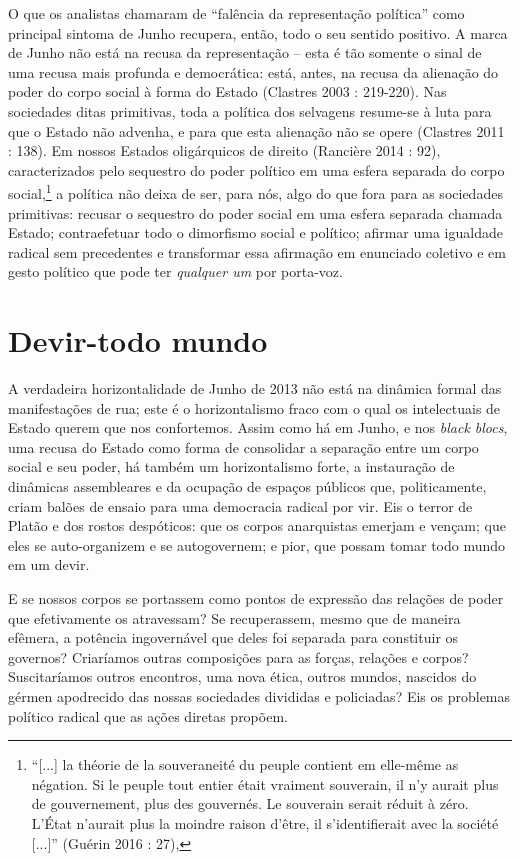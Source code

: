 O que os analistas chamaram de ``falência da representação política''
como principal sintoma de Junho recupera, então, todo o seu sentido
positivo. A marca de Junho não está na recusa da representação -- esta é
tão somente o sinal de uma recusa mais profunda e democrática: está,
antes, na recusa da alienação do poder do corpo social à forma do Estado
(Clastres 2003 : 219-220). Nas sociedades ditas primitivas, toda a
política dos selvagens resume-se à luta para que o Estado não advenha, e
para que esta alienação não se opere (Clastres 2011 : 138). Em nossos
Estados oligárquicos de direito (Rancière 2014 : 92), caracterizados
pelo sequestro do poder político em uma esfera separada do corpo
social,\footnote{``{[}...{]} la théorie de la souveraneité du peuple
  contient em elle-même as négation. Si le peuple tout entier était
  vraiment souverain, il n'y aurait plus de gouvernement, plus des
  gouvernés. Le souverain serait réduit à zéro. L'État n'aurait plus la
  moindre raison d'être, il s'identifierait avec la société {[}...{]}''
  (Guérin 2016 : 27),} a política não deixa de ser, para nós, algo do
que fora para as sociedades primitivas: recusar o sequestro do poder
social em uma esfera separada chamada Estado; contraefetuar todo o
dimorfismo social e político; afirmar uma igualdade radical sem
precedentes e transformar essa afirmação em enunciado coletivo e em
gesto político que pode ter \emph{qualquer um }por porta-voz.

\section{Devir-todo mundo}

A verdadeira horizontalidade de Junho de
2013 não está na dinâmica formal das manifestações de rua; este é o
horizontalismo fraco com o qual os intelectuais de Estado querem que nos
confortemos. Assim como há em Junho, e nos \emph{black blocs}, uma
recusa do Estado como forma de consolidar a separação entre um corpo
social e seu poder, há também um horizontalismo forte, a instauração de
dinâmicas assembleares e da ocupação de espaços públicos que,
politicamente, criam balões de ensaio para uma democracia radical por
vir. Eis o terror de Platão e dos rostos despóticos: que os corpos
anarquistas emerjam e vençam; que eles se auto-organizem e se
autogovernem; e pior, que possam tomar todo mundo em um devir.

E se nossos corpos se portassem como pontos de expressão das relações de
poder que efetivamente os atravessam? Se recuperassem, mesmo que de
maneira efêmera, a potência ingovernável que deles foi separada para
constituir os governos? Criaríamos outras composições para as forças,
relações e corpos? Suscitaríamos outros encontros, uma nova ética,
outros mundos, nascidos do gérmen apodrecido das nossas sociedades
divididas e policiadas? Eis os problemas político radical que as ações
diretas propõem.

